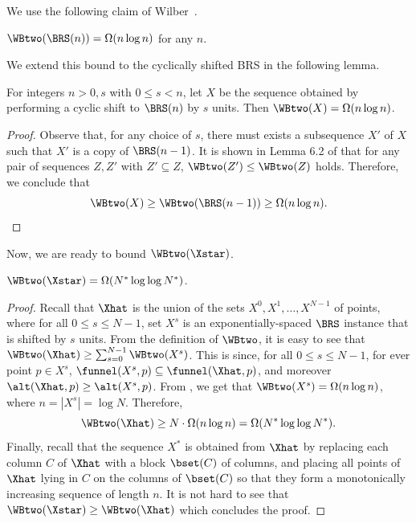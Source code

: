 We use the following claim of Wilber~\cite{wilber}. %
%
\begin{claim}
$\WBtwo(\BRS(n))=\Omega(n\log n)$ for any $n$.
\end{claim}

We extend this bound to the cyclically shifted BRS in the following lemma.
\begin{lemma}
\label{lem:shifted BRS} For integers $n>0,s$ with  $0\leq s<n$, let $X$ be the sequence obtained by performing
a cyclic shift to $\BRS(n)$ by $s$ units. Then $\WBtwo(X)=\Omega(n\log n)$. 
\end{lemma}

\begin{proof}
Observe that, for any choice of $s$, there must exists
a subsequence $X'$ of $X$ such that $X'$ is a copy of $\BRS(n-1)$. It is shown in Lemma 6.2 of \cite{LevyT19}
that for any pair of sequences $Z,Z'$ with $Z'\subseteq Z$, $\WBtwo(Z')\le\WBtwo(Z)$ holds. Therefore, we conclude that
\[
\WBtwo(X)\ge\WBtwo(\BRS(n-1))\ge \Omega(n\log n).
\]
\end{proof}





Now, we are ready to bound  $\WBtwo(\Xstar)$.

\begin{lemma}
$\WBtwo(\Xstar)=\Omega(N^{*}\log\log N^{*})$.
\end{lemma}

\begin{proof}
Recall that $\Xhat$ is the union of the sets $X^{0},X^{1},\dots,X^{N-1}$ of points, where for all $0\leq s\leq N-1$, set $X^{s}$ is an exponentially-spaced $\BRS$ instance that is shifted
by $s$ units. From the definition
of $\WBtwo$, it is easy to see that $\WBtwo(\Xhat)\ge\sum_{s=0}^{N-1}\WBtwo(X^{s})$. This is since, for all $0\leq s\leq N-1$, for ever point $p\in X^{s}$, $\funnel(X^s,p)\subseteq \funnel(\Xhat, p)$, and moreover $\alt(\Xhat,p)\geq \alt(X^s,p)$.
From , we get that $\WBtwo(X^{s})=\Omega(n\log n)$, where $n=|X^s|=\log N$. Therefore,
\[
\WBtwo(\Xhat)\ge N\cdot\Omega(n\log n)=\Omega(N^{*}\log\log N^{*}).
\]
Finally, recall that the sequence $X^{*}$ is obtained from $\Xhat$
by replacing each column $C$ of $\Xhat$ with a block $\bset(C)$ of columns, and placing all points of $\Xhat$ lying in $C$ on the columns of $\bset(C)$ so that they form a monotonically increasing sequence of length $n$. It is not hard to see that $\WBtwo(\Xstar)\ge\WBtwo(\Xhat)$
which concludes the proof.
\end{proof}

